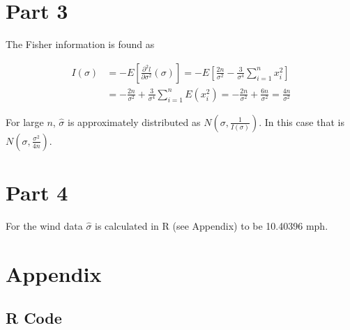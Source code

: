 \documentclass[11pt]{article}
\begin{document}
\section*{Part 3}

The Fisher information is found as

\begin{align*}
I(\sigma) &= - E\left[ \frac{\partial^2 l}{\partial \sigma^2}(\sigma)\right]
= - E\left[ \frac{2n}{\sigma^2} - \frac{3}{\sigma^4} \sum_{i=1}^n {x_i^2} \right] \\
&= - \frac{2n}{\sigma^2} + \frac{3}{\sigma^4} \sum_{i=1}^n {E(x_i^2)}
= - \frac{2n}{\sigma^2} + \frac{6n}{\sigma^2} = \frac{4n}{\sigma^2}
\end{align*}

For large $ n $, $ \hat\sigma $ is approximately distributed as $ N(\sigma, \frac{1}{I(\sigma)}) $. In this case that is $ N(\sigma, \frac{\sigma^2}{4n}) $.

\section*{Part 4}

For the wind data $ \hat\sigma $ is calculated in R (see Appendix) to be 10.40396 mph.

\newpage
\section*{Appendix}
\subsection*{R Code}

\end{document}
